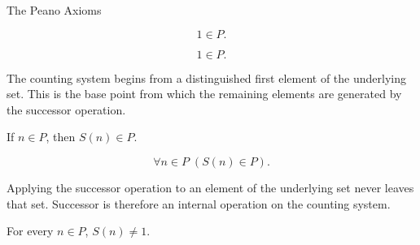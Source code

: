 \begin{topicbox}{The Peano Axioms}
\NoLocalDependencies

\begin{tcolorbox}[colback=axiombox, colframe=axiomborder, arc=2pt,
  left=6pt, right=6pt, top=4pt, bottom=4pt,
  title={\small\textbf{Axiom (One Is a Natural Number)}},
  fonttitle=\small\bfseries]
\begin{axiom}
\label{ax:peano-one-in-n}
\[
1 \in P.
\]
\end{axiom}
\end{tcolorbox}

\begin{remark*}
\[
1 \in P.
\]
\end{remark*}

\begin{remark*}[Interpretation]
The counting system begins from a distinguished first element of the
underlying set. This is the base point from which the remaining elements are
generated by the successor operation.
\end{remark*}

\NoLocalDependencies

\begin{tcolorbox}[colback=axiombox, colframe=axiomborder, arc=2pt,
  left=6pt, right=6pt, top=4pt, bottom=4pt,
  title={\small\textbf{Axiom (Closure Under Successor)}},
  fonttitle=\small\bfseries]
\begin{axiom}
\label{ax:peano-successor-closure}
If $n \in P$, then $S(n) \in P$.
\end{axiom}
\end{tcolorbox}

\begin{remark*}
\[
\forall n \in P\;(S(n) \in P).
\]
\end{remark*}

\begin{remark*}[Interpretation]
Applying the successor operation to an element of the underlying set never
leaves that set. Successor is therefore an internal operation on the counting
system.
\end{remark*}

\NoLocalDependencies

\begin{tcolorbox}[colback=axiombox, colframe=axiomborder, arc=2pt,
  left=6pt, right=6pt, top=4pt, bottom=4pt,
  title={\small\textbf{Axiom (One Is Not a Successor)}},
  fonttitle=\small\bfseries]
\begin{axiom}
\label{ax:peano-one-not-successor}
For every $n \in P$, $S(n) \neq 1$.
\end{axiom}
\end{tcolorbox}


\end{topicbox}
